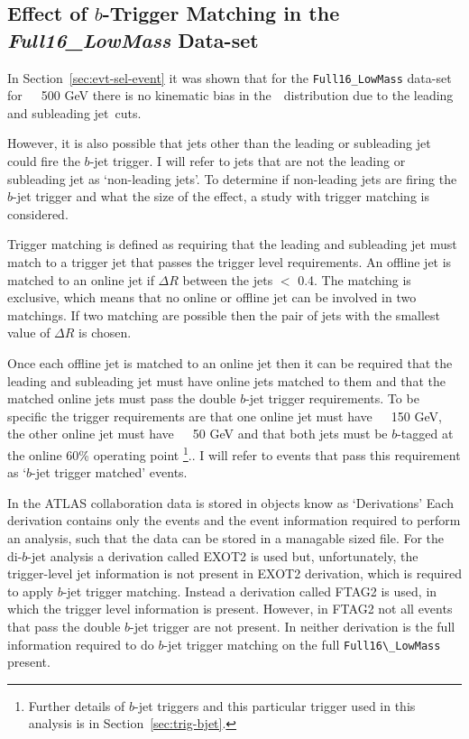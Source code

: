 \subsection{Effect of $b$-Trigger Matching in the \textit{Full16\_LowMass} Data-set}

In Section~\ref{sec:evt-sel-event} it was shown that for the \verb|Full16_LowMass| data-set
for~\mjj~\gt~500 GeV there is no kinematic bias in the~\mjj~distribution
due to the leading and subleading jet~\pT cuts.

However, it is also possible that jets other than the leading or subleading jet could fire the $b$-jet trigger.
I will refer to jets that are not the leading or subleading jet as `non-leading jets'.
To determine if non-leading jets are firing the $b$-jet trigger and what the size of the effect,
a study with trigger matching is considered.

Trigger matching is defined as requiring that the
leading and subleading jet must match to a trigger jet that passes the trigger level requirements.
An offline jet is matched to an online jet if $\Delta R$ between the jets $<$ 0.4.
The matching is exclusive, which means that no online or offline jet can be involved in two matchings.
If two matching are possible then the pair of jets with the smallest value of $\Delta R$ is chosen.

Once each offline jet is matched to an online jet then it can be required that
the leading and subleading jet must have online jets matched to them
and that the matched online jets must pass the double $b$-jet trigger requirements.
To be specific the trigger requirements are that
one online jet must have~\pT~\gt~150 GeV,
the other online jet must have~\pT~\gt~50 GeV
and that both jets must be $b$-tagged at the online 60\% operating point
\footnote{Further details of $b$-jet triggers and this particular trigger used in this analysis is in Section~\ref{sec:trig-bjet}.}..
I will refer to events that pass this requirement as `$b$-jet trigger matched' events.

In the ATLAS collaboration data is stored in objects know as `Derivations'
Each derivation contains only the events and the event information required to perform an analysis,
such that the data can be stored in a managable sized file.
For the di-$b$-jet analysis a derivation called EXOT2 is used
but, unfortunately, the trigger-level jet information is not present in EXOT2 derivation,
which is required to apply $b$-jet trigger matching.
Instead a derivation called FTAG2 is used, in which the trigger level information is present.
However, in FTAG2 not all events that pass the double $b$-jet trigger are not present.
In neither derivation is the full information required to do $b$-jet trigger matching on the full \verb|Full16\_LowMass| present.

